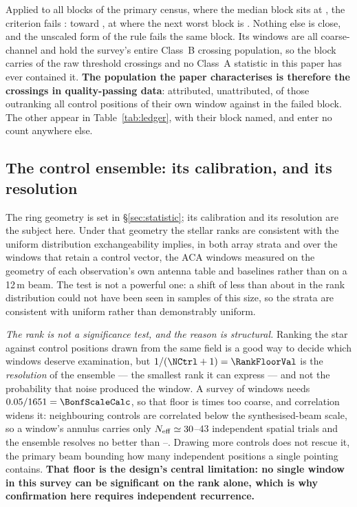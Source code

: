Applied to all \BqNBlocks{} blocks of the primary census, where the median
block sits at \BqQMed, the criterion fails \BqNFail: \BqFailBlock{} toward
\BqFailStar, at \BqFailQ{} where the next worst block is \BqNextQ. Nothing
else is close, and the unscaled form of the rule fails the same
\BqRawNFail{} block. Its \BqFailNWin{} windows are all coarse-channel and
hold the survey's entire Class~B crossing population, so the block carries
\EvNCrossFlag{} of the \EvNCrossRaw{} raw threshold crossings and no Class~A
statistic in this paper has ever contained it. \textbf{The population the
paper characterises is therefore the \EvNCrossQp{} crossings in
quality-passing data}: \EvNAttrQp{} attributed, \EvNUnattrQp{} unattributed,
\EvNRankQp{} of those outranking all \NCtrl{} control positions of their own
window against \EvNRankFlag{} in the failed block. The other
\EvNCrossFlag{} appear in Table~\ref{tab:ledger}, with their block named, and
enter no count anywhere else.

\subsection{The control ensemble: its calibration, and its resolution}

The ring geometry is set in \S\ref{sec:statistic}; its calibration and its
resolution are the subject here. Under that geometry the stellar ranks are
consistent with the uniform distribution exchangeability implies, in both
array strata and over the \VerNTested{} windows that retain a control vector,
the ACA windows measured on the geometry of each observation's own antenna
table and baselines rather than on a 12\,m beam. The test is not a powerful
one: a shift of less than about \VerKsPowerAca{} in the rank distribution
could not have been seen in samples of this size, so the strata are
consistent with uniform rather than demonstrably uniform.

\emph{The rank is not a significance test, and the reason is structural.}
Ranking the star against \NCtrl{} control positions drawn from the same field
is a good way to decide which windows deserve examination, but
$1/(\NCtrl+1)=\RankFloorVal$ is the \emph{resolution} of the ensemble --- the
smallest rank it can express --- and not the probability that noise produced
the window. A survey of \NWindows{} windows needs
$0.05/\NWindows=\BonfScaleCalc$, so that floor is \BonfRankRatio{} times too
coarse, and correlation widens it: neighbouring controls are correlated below
the synthesised-beam scale, so a window's annulus carries only
$N_{\rm eff}\simeq30$--$43$ independent spatial trials and the ensemble
resolves no better than \RankEffLo--\RankEffHi. Drawing more controls does
not rescue it, the primary beam bounding how many independent positions a
single pointing contains. \textbf{That floor is the design's central
limitation: no single window in this survey can be significant on the rank
alone, which is why confirmation here requires independent recurrence.}

